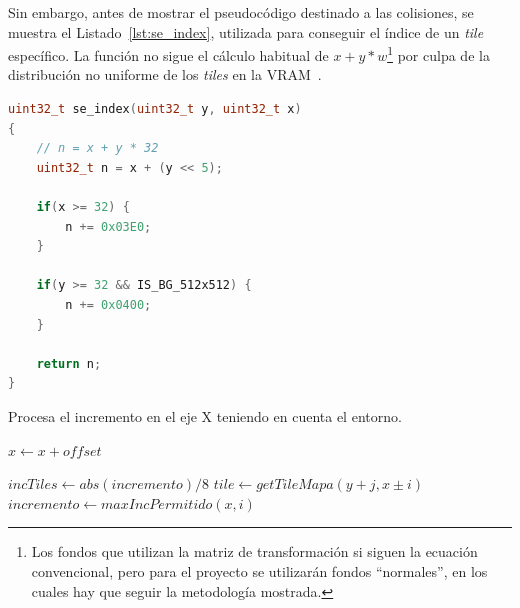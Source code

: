 Sin embargo, antes de mostrar el pseudocódigo destinado a las colisiones, se muestra el Listado~\ref{lst:se_index}, utilizada para conseguir el índice de un \textit{tile} específico. La función no sigue el cálculo habitual de $x+y*w$\footnote{Los fondos que utilizan la matriz de transformación si siguen la ecuación convencional, pero para el proyecto se utilizarán fondos ``normales'', en los cuales hay que seguir la metodología mostrada.} por culpa de la distribución no uniforme de los \textit{tiles} en la VRAM~\cite{bib:tonc}.

\vspace{1cm}

\begin{lstlisting}[language=c,label=lst:se_index,caption=Fragmento de código de la librería TONC.]
uint32_t se_index(uint32_t y, uint32_t x)
{
	// n = x + y * 32
	uint32_t n = x + (y << 5);

	if(x >= 32) {
		n += 0x03E0;
	}

	if(y >= 32 && IS_BG_512x512) {
		n += 0x0400;
	}

	return n;
}
\end{lstlisting}

\vspace{2cm}

\begin{algorithm}[h]
	\footnotesize
	\caption{Procesa el incremento en el eje X teniendo en cuenta el entorno.}
	\label{algo:col_entorno_x}
	\DontPrintSemicolon %

	 {
		$x \gets x + offset$\;
	}

	$incTiles \gets abs(incremento) / 8$\;
	 {
		 {
			$tile \gets getTileMapa(y+j, x{\pm}i)$\;
			 {
				$incremento \gets maxIncPermitido(x,i)$\;
				\;
			}
		}
		}
		\;
\end{algorithm}

